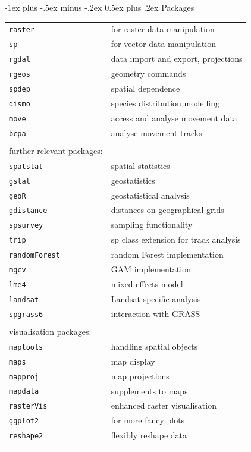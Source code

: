 \documentclass[10pt,landscape]{article}
\makeatletter
\renewcommand{\section}{\@startsection{section}{1}{0mm}%
                                {-1ex plus -.5ex minus -.2ex}%
                                {0.5ex plus .2ex}%
                                {\normalfont\large\bfseries}}
\makeatother
\begin{document}
\begin{multicols}{3}
\section{Packages}
\begin{tabular}{@{}ll@{}}
\verb!raster!    & for raster data manipulation \\
\verb!sp!     & for vector data manipulation \\
\verb!rgdal!  & data import and export, projections \\
\verb!rgeos!  & geometry commands \\
\verb!spdep!  & spatial dependence \\
\verb!dismo!  &  species distribution modelling \\
\verb!move!  & access and analyse movement data\\
\verb!bcpa!  & analyse movement tracks\\
& \\
further relevant packages:\\
% 
\verb!spatstat!  & spatial statistics\\
\verb!gstat!  & geostatistics\\
\verb!geoR!  & geostatistical analysis\\
\verb!gdistance!  & distances on geographical grids\\
\verb!spsurvey!  & sampling functionality\\
\verb!trip!  & sp class extension for track analysis\\
\verb!randomForest!  & random Forest implementation\\
\verb!mgcv!  & GAM implementation\\
\verb!lme4!  & mixed-effects model\\
\verb!landsat!  & Landsat specific analysis\\
\verb!spgrass6!  & interaction with GRASS\\
% 
& \\
visualisation packages:\\
\verb!maptools!  & handling spatial objects\\
\verb!maps!  & map display\\
\verb!mapproj!  & map projections\\
\verb!mapdata!  & supplements to maps\\
\verb!rasterVis!  & enhanced raster visualisation\\
\verb!ggplot2!  & for more fancy plots\\
\verb!reshape2!  & flexibly reshape data \\
 & 
\end{tabular}


\end{multicols}
\end{document}
